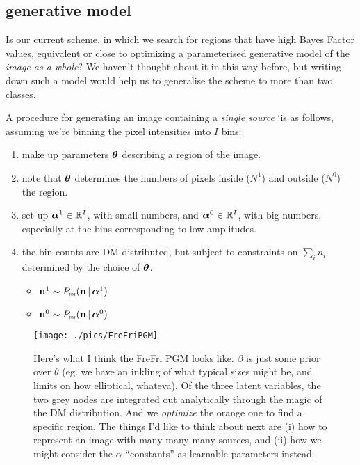 \documentclass[12pt]{article}
\begin{document}
\subsection{generative model}
Is our current scheme, in which we search for regions that have high
Bayes Factor values, equivalent or close to optimizing a parameterised
generative model of the \emph{image as a whole}? We haven't thought about it
in this way before, but writing down such a model would help us to
generalise the scheme to more than two classes.

A procedure for generating an image containing a \emph{single source}
`is as follows, assuming we're binning the pixel intensities into $I$ bins:
\begin{enumerate}
\item make up parameters $\boldsymbol\theta$ describing a region of the image.
\item note that $\boldsymbol\theta$ determines the numbers of pixels inside ($N^1$)  and  outside ($N^0$) the region.
\item set up $\boldsymbol\alpha^1 \in \mathbb{R}^I$, with small numbers,
  and $\boldsymbol\alpha^0 \in \mathbb{R}^I$, with big numbers, especially at the bins corresponding to low amplitudes.
\item the bin counts are DM distributed, but subject to constraints on $\sum_i n_i$ determined by the choice of $\boldsymbol\theta$.
  \begin{itemize}
    \item    $\mathbf{n}^1 \sim P_\text{\tiny\sc dm}(\mathbf{n} \,|\, \boldsymbol\alpha^1)$
    \item $\mathbf{n}^0 \sim P_\text{\tiny\sc dm}(\mathbf{n} \,|\, \boldsymbol\alpha^0)$
  \end{itemize}
\end{enumerate}


\begin{figure}
\texttt{[image: ./pics/FreFriPGM]}
\caption{Here's what I think the {\sc FreFri} PGM looks like. $\beta$ is just some prior over $\theta$ (eg. we have an inkling of what typical sizes might be, and limits on how elliptical, whateva). Of the three latent variables, the two grey nodes are integrated out analytically through the magic of the DM distribution. And we {\it optimize} the orange one to find a specific region. The things I'd like to think about next are (i) how to represent an image with many many many sources, and (ii) how we might consider the $\alpha$ ``constants'' as learnable parameters instead.
\label{fig:FreFriPGM}
}
\end{figure}
\end{document}
